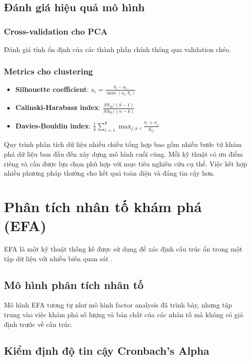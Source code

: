 \subsection{Đánh giá hiệu quả mô hình}
\subsubsection*{Cross-validation cho PCA}
Đánh giá tính ổn định của các thành phần chính thông qua validation chéo.

\subsubsection*{Metrics cho clustering}
\begin{itemize}
    \item \textbf{Silhouette coefficient}: $s_i = \frac{b_i - a_i}{\max(a_i, b_i)}$
    \item \textbf{Calinski-Harabasz index}: $\frac{SS_B/(k-1)}{SS_W/(n-k)}$
    \item \textbf{Davies-Bouldin index}: $\frac{1}{k}\sum_{i=1}^k \max_{j \neq i} \frac{\sigma_i + \sigma_j}{d_{ij}}$
\end{itemize}

Quy trình phân tích dữ liệu nhiều chiều tổng hợp bao gồm nhiều bước từ khám phá dữ liệu ban đầu đến xây dựng mô hình cuối cùng. Mỗi kỹ thuật có ưu điểm riêng và cần được lựa chọn phù hợp với mục tiêu nghiên cứu cụ thể. Việc kết hợp nhiều phương pháp thường cho kết quả toàn diện và đáng tin cậy hơn.

\section{Phân tích nhân tố khám phá (EFA)}

EFA là một kỹ thuật thống kê được sử dụng để xác định cấu trúc ẩn trong một tập dữ liệu với nhiều biến quan sát \cite{vu2022, hair2019, tabachnick2019}.

\subsection{Mô hình phân tích nhân tố}

Mô hình EFA tương tự như mô hình factor analysis đã trình bày, nhưng tập trung vào việc khám phá số lượng và bản chất của các nhân tố mà không có giả định trước về cấu trúc.

\subsection{Kiểm định độ tin cậy Cronbach's Alpha}


